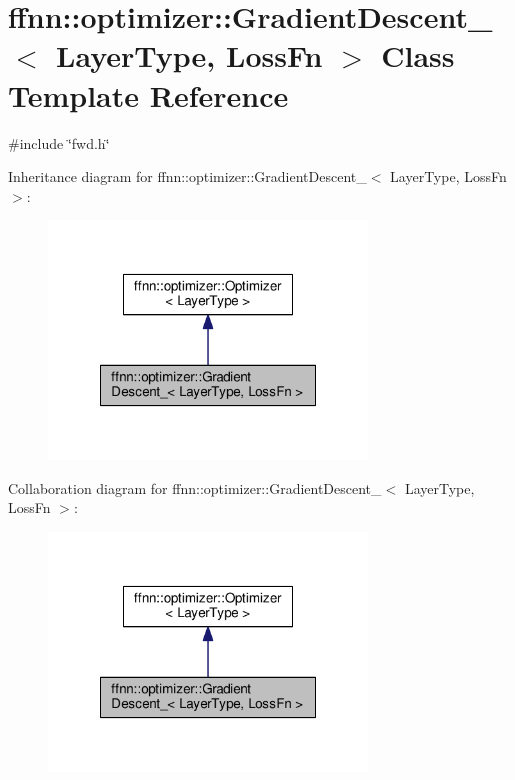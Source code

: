 \hypertarget{classffnn_1_1optimizer_1_1_gradient_descent__}{\section{ffnn\-:\-:optimizer\-:\-:Gradient\-Descent\-\_\-$<$ Layer\-Type, Loss\-Fn $>$ Class Template Reference}
\label{classffnn_1_1optimizer_1_1_gradient_descent__}
}


{\ttfamily \#include \char`\"{}fwd.\-h\char`\"{}}



Inheritance diagram for ffnn\-:\-:optimizer\-:\-:Gradient\-Descent\-\_\-$<$ Layer\-Type, Loss\-Fn $>$\-:
\nopagebreak
\begin{figure}[H]
\begin{center}
\leavevmode
\includegraphics[width=240pt]{classffnn_1_1optimizer_1_1_gradient_descent____inherit__graph}
\end{center}
\end{figure}


Collaboration diagram for ffnn\-:\-:optimizer\-:\-:Gradient\-Descent\-\_\-$<$ Layer\-Type, Loss\-Fn $>$\-:
\nopagebreak
\begin{figure}[H]
\begin{center}
\leavevmode
\includegraphics[width=240pt]{classffnn_1_1optimizer_1_1_gradient_descent____coll__graph}
\end{center}
\end{figure}
